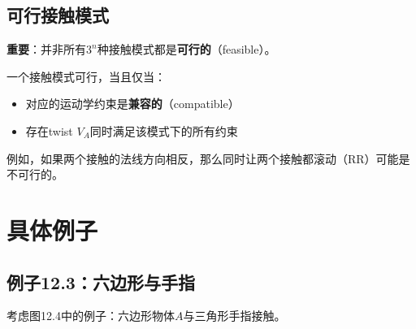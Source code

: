 \documentclass[12pt,a4paper]{article}
\begin{document}
\subsection{可行接触模式}

\textbf{重要}：并非所有$3^n$种接触模式都是\textbf{可行的}（feasible）。

一个接触模式可行，当且仅当：
\begin{itemize}
\item 对应的运动学约束是\textbf{兼容的}（compatible）
\item 存在twist $V_A$同时满足该模式下的所有约束
\end{itemize}

例如，如果两个接触的法线方向相反，那么同时让两个接触都滚动（RR）可能是不可行的。

\section{具体例子}

\subsection{例子12.3：六边形与手指}

考虑图12.4中的例子：六边形物体$A$与三角形手指接触。
\end{document}
